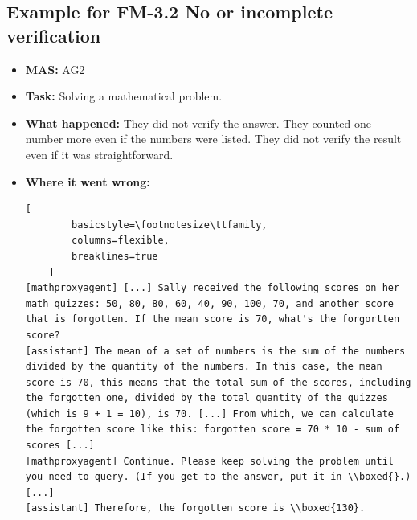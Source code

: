 \subsection{Example for FM-3.2 No or incomplete verification}\label{ex:fm1.3}\label{ex:fm4.3}
\begin{itemize}
    \item \textbf{MAS:} AG2
    \item \textbf{Task:} Solving a mathematical problem. 
    \item \textbf{What happened:} They did not verify the answer. They counted one number more even if the numbers were listed. They did not verify the result even if it was straightforward.  
    \item \textbf{Where it went wrong:}
    \begin{lstlisting}[
        basicstyle=\footnotesize\ttfamily,
        columns=flexible,
        breaklines=true
    ]
[mathproxyagent] [...] Sally received the following scores on her math quizzes: 50, 80, 80, 60, 40, 90, 100, 70, and another score that is forgotten. If the mean score is 70, what's the forgortten score?
[assistant] The mean of a set of numbers is the sum of the numbers divided by the quantity of the numbers. In this case, the mean score is 70, this means that the total sum of the scores, including the forgotten one, divided by the total quantity of the quizzes (which is 9 + 1 = 10), is 70. [...] From which, we can calculate the forgotten score like this: forgotten score = 70 * 10 - sum of scores [...]
[mathproxyagent] Continue. Please keep solving the problem until you need to query. (If you get to the answer, put it in \\boxed{}.)
[...]
[assistant] Therefore, the forgotten score is \\boxed{130}. 
    \end{lstlisting}
\end{itemize}



